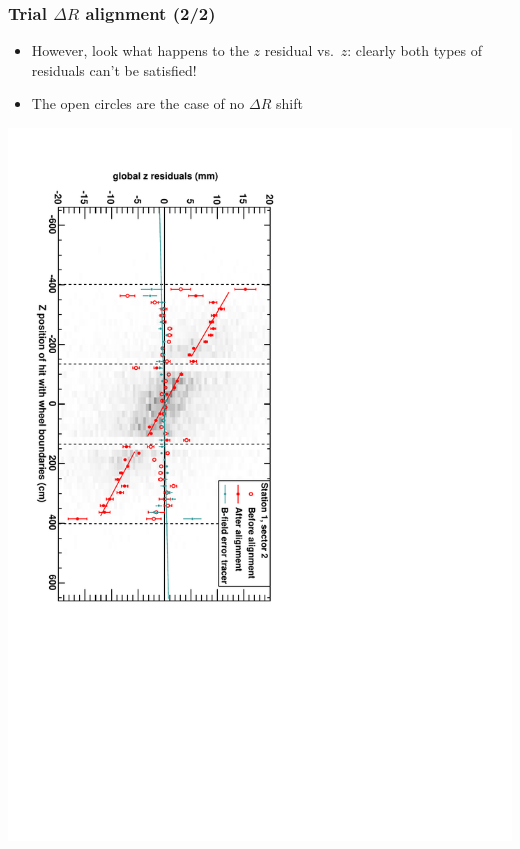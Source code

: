\documentclass[compress]{beamer}
\begin{document}
\begin{frame}
\frametitle{Trial $\Delta R$ alignment (2/2)}

\begin{itemize}
\item However, look what happens to the $z$ residual vs.\ $z$: clearly both types of residuals can't be satisfied!
\item The open circles are the case of no $\Delta R$ shift
\end{itemize}

\includegraphics[height=\linewidth, angle=90]{DTzVsZ_st1_sr02_out15mm.pdf}
\end{frame}
\end{document}
